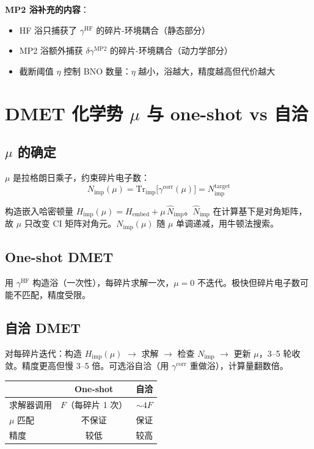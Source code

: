 \documentclass[11pt,a4paper]{article}
\begin{document}
\textbf{MP2 浴补充的内容}：
\begin{itemize}
  \item HF 浴只捕获了 $\gamma^{\text{HF}}$ 的碎片-环境耦合（静态部分）
  \item MP2 浴额外捕获 $\delta\gamma^{\text{MP2}}$ 的碎片-环境耦合（动力学部分）
  \item 截断阈值 $\eta$ 控制 BNO 数量：$\eta$ 越小，浴越大，精度越高但代价越大
\end{itemize}

\section*{DMET 化学势 $\mu$ 与 one-shot vs 自洽}

\subsection*{$\mu$ 的确定}

$\mu$ 是拉格朗日乘子，约束碎片电子数：
$$N_{\text{imp}}(\mu) = \text{Tr}_{\text{imp}}\big[\gamma^{\text{corr}}(\mu)\big] = N_{\text{imp}}^{\text{target}}$$

构造嵌入哈密顿量 $H_{\text{imp}}(\mu) = H_{\text{embed}} + \mu\,\hat{N}_{\text{imp}}$。$\hat{N}_{\text{imp}}$ 在计算基下是对角矩阵，故 $\mu$ 只改变 CI 矩阵对角元。$N_{\text{imp}}(\mu)$ 随 $\mu$ 单调递减，用牛顿法搜索。

\subsection*{One-shot DMET}

用 $\gamma^{\text{HF}}$ 构造浴（一次性），每碎片求解一次，$\mu = 0$ 不迭代。极快但碎片电子数可能不匹配，精度受限。

\subsection*{自洽 DMET}

对每碎片迭代：构造 $H_{\text{imp}}(\mu)$ $\to$ 求解 $\to$ 检查 $N_{\text{imp}}$ $\to$ 更新 $\mu$，3--5 轮收敛。精度更高但慢 3--5 倍。可选浴自洽（用 $\gamma^{\text{corr}}$ 重做浴），计算量翻数倍。

\begin{center}
\begin{tabular}{lcc}
  \toprule
  & One-shot & 自洽 \\
  \midrule
  求解器调用 & $F$（每碎片 1 次） & $\sim 4F$ \\
  $\mu$ 匹配 & 不保证 & 保证 \\
  精度 & 较低 & 较高 \\
  \bottomrule
\end{tabular}
\end{center}
\end{document}
